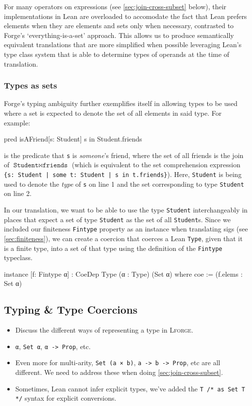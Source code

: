 For many operators on expressions (see \cref{sec:join-cross-subset} below), their implementations in Lean are overloaded to accomodate the fact that Lean prefers elements when they are elements and sets only when necessary, contrasted to Forge's `everything-is-a-set' approach. This allows us to produce semantically equivalent translations that are more simplified when possible leveraging Lean's type class system that is able to determine types of operands at the time of translation. 

\subsubsection{Types as sets}
Forge's typing ambiguity further exemplifies itself in allowing types to be used where a set is expected to denote the set of all elements in said type. For example:
\begin{forge}
pred isAFriend[s: Student] {
  s in Student.friends
}
\end{forge}
is the predicate that \texttt{s} is \emph{someone}'s friend, where the set of all friends is the join of $\texttt{Student} \bowtie \texttt{friends}$ (which is equivalent to the set comprehension expression \texttt{\{s: Student | some t: Student | s in t.friends\}}). Here, \texttt{Student} is being used to denote the \emph{type} of \texttt{s} on line 1 and the set corresponding to type \texttt{Student} on line 2. 

In our translation, we want to be able to use the type \texttt{Student} interchangeably in places that expect a set of type \texttt{Student} as the set of all \texttt{Student}s. Since we included our finiteness \texttt{Fintype} property as an instance when translating sigs (see \cref{sec:finiteness}), we can create a coercion that coerces a Lean \texttt{Type}, given that it is a finite type, into a set of that type using the definition of the \texttt{Fintype} typeclass. 
\begin{leanimpl*}
instance [f: Fintype α] : CoeDep Type (α : Type) (Set α) where
  coe := (f.elems : Set α)
\end{leanimpl*}

\subsection{Typing \& Type Coercions}\label{sec:type-coercions}
{\color{OliveGreen}
\begin{itemize}
  \item Discuss the different ways of representing a type in \textsc{Lforge}.
  \item \texttt{α}, \texttt{Set α}, \texttt{α -> Prop}, etc. 
  \item Even more for multi-arity, \texttt{Set (a × b)}, \texttt{a -> b -> Prop}, etc are all different. We need to address these when doing \cref{sec:join-cross-subset}. 
  \item Sometimes, Lean cannot infer explicit types, we've added the \texttt{T /* as Set T */} syntax for explicit conversions. 
\end{itemize}}

